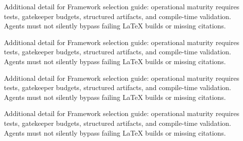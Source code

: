 Additional detail for Framework selection guide: operational maturity requires tests, gatekeeper budgets, structured artifacts, and compile-time validation. Agents must not silently bypass failing LaTeX builds or missing citations. \cite{crewai2024} \cite{langgraph2024}

Additional detail for Framework selection guide: operational maturity requires tests, gatekeeper budgets, structured artifacts, and compile-time validation. Agents must not silently bypass failing LaTeX builds or missing citations. \cite{crewai2024} \cite{langgraph2024}

Additional detail for Framework selection guide: operational maturity requires tests, gatekeeper budgets, structured artifacts, and compile-time validation. Agents must not silently bypass failing LaTeX builds or missing citations. \cite{crewai2024} \cite{langgraph2024}

Additional detail for Framework selection guide: operational maturity requires tests, gatekeeper budgets, structured artifacts, and compile-time validation. Agents must not silently bypass failing LaTeX builds or missing citations. \cite{crewai2024} \cite{langgraph2024}
